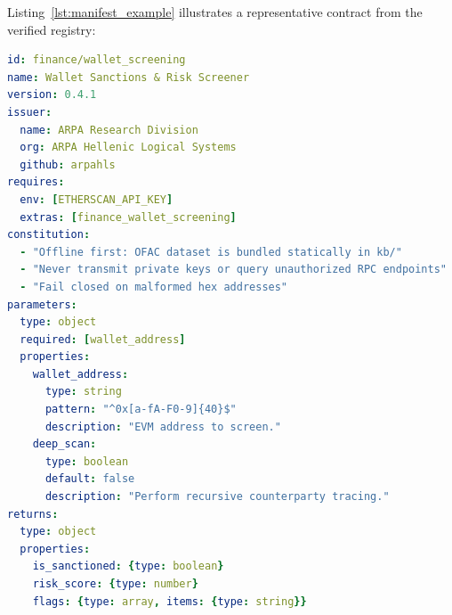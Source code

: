 Listing~\ref{lst:manifest_example} illustrates a representative contract from the verified registry:

\begin{lstlisting}[language=yaml, caption={Concrete Skillware Contract (\texttt{manifest.yaml}) for \texttt{finance/wallet\_screening}.}, label={lst:manifest_example}]
id: finance/wallet_screening
name: Wallet Sanctions & Risk Screener
version: 0.4.1
issuer:
  name: ARPA Research Division
  org: ARPA Hellenic Logical Systems
  github: arpahls
requires:
  env: [ETHERSCAN_API_KEY]
  extras: [finance_wallet_screening]
constitution:
  - "Offline first: OFAC dataset is bundled statically in kb/"
  - "Never transmit private keys or query unauthorized RPC endpoints"
  - "Fail closed on malformed hex addresses"
parameters:
  type: object
  required: [wallet_address]
  properties:
    wallet_address:
      type: string
      pattern: "^0x[a-fA-F0-9]{40}$"
      description: "EVM address to screen."
    deep_scan:
      type: boolean
      default: false
      description: "Perform recursive counterparty tracing."
returns:
  type: object
  properties:
    is_sanctioned: {type: boolean}
    risk_score: {type: number}
    flags: {type: array, items: {type: string}}
\end{lstlisting}

